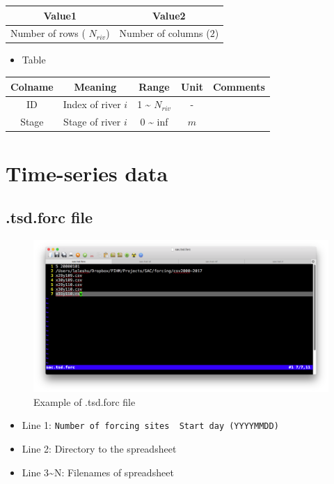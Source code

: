 \documentclass[]{scrbook}
\providecommand{\tightlist}{%
  \setlength{\itemsep}{0pt}\setlength{\parskip}{0pt}}
\begin{document}
\begin{longtable}[]{@{}cc@{}}
\toprule
Value1 & Value2\tabularnewline
\midrule
\endhead
Number of rows ( \(N_{riv}\)) & Number of columns (\(2\))\tabularnewline
\bottomrule
\end{longtable}

\begin{itemize}
\tightlist
\item
  Table
\end{itemize}

\begin{longtable}[]{@{}ccccc@{}}
\toprule
Colname & Meaning & Range & Unit & Comments\tabularnewline
\midrule
\endhead
ID & Index of river \(i\) & 1 \textasciitilde{} \(N_{riv}\) & -
&\tabularnewline
Stage & Stage of river \(i\) & 0 \textasciitilde{} inf & \(m\)
&\tabularnewline
\bottomrule
\end{longtable}

\section{Time-series data}\label{time-series-data}

\subsection{.tsd.forc file}\label{tsd.forc-file}

\begin{figure}
\centering
\includegraphics{Fig/IO/tsd.forc.png}
\caption{Example of .tsd.forc file}
\end{figure}

\begin{itemize}
\tightlist
\item
  Line 1:
  \texttt{Number\ of\ forcing\ sites\ \textbar{}\ Start\ day\ (YYYYMMDD)}
\item
  Line 2: Directory to the spreadsheet
\item
  Line 3\textasciitilde{}N: Filenames of spreadsheet
\end{itemize}
\end{document}
